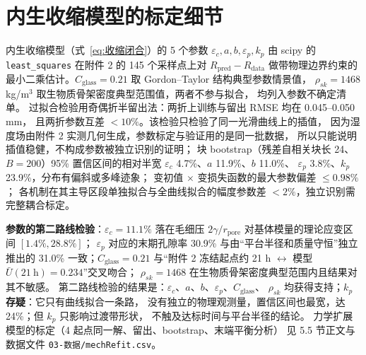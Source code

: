 \documentclass[12pt,a4paper]{ctexart}
\numberwithin{equation}{section}
\begin{document}
\section{内生收缩模型的标定细节}
内生收缩模型（式~\eqref{eq:收缩闭合}）的 5 个参数
$\varepsilon_c,a,b,\varepsilon_p,k_p$ 由 scipy 的 \texttt{least\_squares}
在附件 2 的 145 个采样点上对 $R_{\mathrm{pred}}-R_{\mathrm{data}}$ 做带物理边界约束的
最小二乘估计。$C_{\mathrm{glass}}=0.21$ 取 Gordon--Taylor 结构典型参数情景值，
$\rho_{sk}=1468$ kg/m$^3$ 取生物质骨架密度典型范围值，两者不参与拟合，
均列入参数不确定清单。
过拟合检验用奇偶折半留出法：两折上训练与留出 RMSE 均在 0.045--0.050 mm，
且两折参数互差 $<10\%$。该检验只检验了同一光滑曲线上的插值，
因为湿度场由附件 2 实测几何生成，参数标定与验证用的是同一批数据，
所以只能说明插值稳健，不构成参数被独立识别的证明；
块 bootstrap（残差自相关块长 24、$B=200$）95\%
置信区间的相对半宽 $\varepsilon_c$ 4.7\%、$a$ 11.9\%、$b$ 11.0\%、
$\varepsilon_p$ 3.8\%、$k_p$ 23.9\%，分布有偏斜或多峰迹象；
变初值 $\times$ 变损失函数的最大参数偏差 $\le0.98\%$；
各机制在其主导区段单独拟合与全曲线拟合的幅度参数差 $<2\%$，独立识别需完整耦合标定。

\textbf{参数的第二路线检验}：$\varepsilon_c=11.1\%$ 落在毛细压
$2\gamma/r_{\mathrm{pore}}$ 对基体模量的理论应变区间 $[1.4\%,28.8\%]$；
$\varepsilon_p$ 对应的末期孔隙率 30.9\% 与由“平台半径和质量守恒”独立推出的
31.0\% 一致；$C_{\mathrm{glass}}=0.21$ 与“附件 2 冻结起点约 21 h
$\leftrightarrow$ 模型 $\bar U(21\ \mathrm{h})=0.234$”交叉吻合；
$\rho_{sk}=1468$ 在生物质骨架密度典型范围内且结果对其不敏感。
第二路线检验的结果是：$\varepsilon_c$、$a$、$b$、$\varepsilon_p$、$C_{\mathrm{glass}}$、
$\rho_{sk}$ 均获得支持；\textbf{$k_p$ 存疑}：它只有曲线拟合一条路，
没有独立的物理观测量，置信区间也最宽，达 24\%；但 $k_p$ 只影响过渡带形状，
不触及达标时间与平台半径的结论。
力学扩展模型的标定（4 起点同一解、留出、bootstrap、末端平衡分析）
见 5.5 节正文与数据文件 \texttt{03-数据/mechRefit.csv}。
\end{document}
